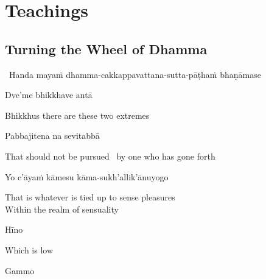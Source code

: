 
\ifdigital
\fi

\ifninebythirteen
\fi

\ifbfive
\fi

\chapter{Teachings}

\ifbfive
\fi

\ifninebythirteen
  \fi



\section{Turning the Wheel of Dhamma}
\label{wheel-of-dhamma-abridged}

\begin{leader}
  \anglebracketleft\ \hspace{-0.5mm}Handa mayaṁ dhamma-cakkappavattana-sutta-pāṭhaṁ \mbox{bhaṇāmase}~\hspace{-0.5mm}\anglebracketright\
\end{leader}

Dve'me bhikkhave antā

\begin{english}
  Bhikkhus there are these two extremes
\end{english}

Pabbajitena na sevitabbā

\begin{english}
  That should not be pursued \breathmark\ by one who has gone forth
\end{english}

Yo c'āyaṁ kāmesu kāma-sukh'allik'ānuyogo

\begin{english}
  That is whatever is tied up to sense pleasures\\
  Within the realm of sensuality
\end{english}

Hīno

\begin{english}
  Which is low
\end{english}

Gammo

